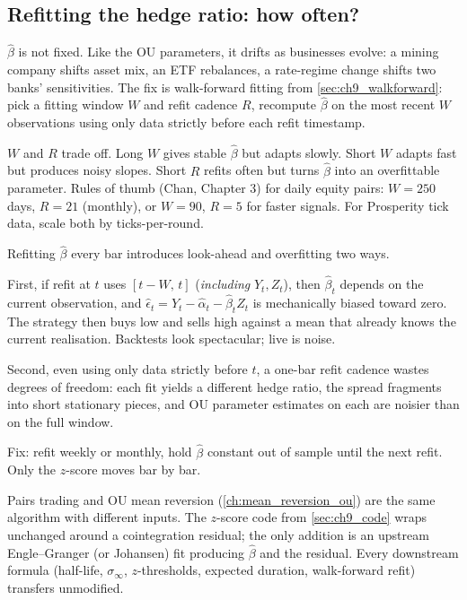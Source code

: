 \subsection{Refitting the hedge ratio: how often?}
\label{subsec:ch10_refit}

$\hat\beta$ is not fixed. Like the OU parameters, it drifts as
businesses evolve: a mining company shifts asset mix, an ETF
rebalances, a rate-regime change shifts two banks' sensitivities.
The fix is walk-forward fitting from \cref{sec:ch9_walkforward}:
pick a fitting window $W$ and refit cadence $R$, recompute
$\hat\beta$ on the most recent $W$ observations using only data
strictly before each refit timestamp.

$W$ and $R$ trade off. Long $W$ gives stable $\hat\beta$ but
adapts slowly. Short $W$ adapts fast but produces noisy slopes.
Short $R$ refits often but turns $\hat\beta$ into an overfittable
parameter. Rules of thumb (Chan, \citeChan{} Chapter 3) for
daily equity pairs: $W = 250$ days, $R = 21$ (monthly), or
$W = 90$, $R = 5$ for faster signals. For Prosperity tick data,
scale both by ticks-per-round.

\begin{pitfallbox}
Refitting $\hat\beta$ every bar introduces look-ahead and
overfitting two ways.

First, if refit at $t$ uses $[t - W,\, t]$ (\emph{including}
$Y_t, Z_t$), then $\hat\beta_t$ depends on the current
observation, and $\hat\epsilon_t = Y_t - \hat\alpha_t -
\hat\beta_t Z_t$ is mechanically biased toward zero. The strategy
then buys low and sells high against a mean that already knows the
current realisation. Backtests look spectacular; live is noise.

Second, even using only data strictly before $t$, a one-bar refit
cadence wastes degrees of freedom: each fit yields a different
hedge ratio, the spread fragments into short stationary pieces,
and OU parameter estimates on each are noisier than on the full
window.

Fix: refit weekly or monthly, hold $\hat\beta$ constant out of
sample until the next refit. Only the $z$-score moves bar by bar.
\end{pitfallbox}

\begin{keyfactbox}
Pairs trading and OU mean reversion (\cref{ch:mean_reversion_ou})
are the same algorithm with different inputs. The $z$-score code
from \cref{sec:ch9_code} wraps unchanged around a cointegration
residual; the only addition is an upstream Engle--Granger (or
Johansen) fit producing $\hat\beta$ and the residual. Every
downstream formula (half-life, $\sigma_\infty$, $z$-thresholds,
expected duration, walk-forward refit) transfers unmodified.
\end{keyfactbox}


